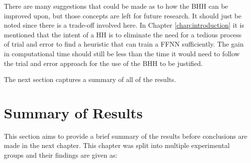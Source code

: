 There are many suggestions that could be made as to how the \ac{BHH} can be improved upon, but those concepts are left for future research. It should just be noted since there is a trade-off involved here. In Chapter \ref{chap:introduction} it is mentioned that the intent of a \ac{HH} is to eliminate the need for a tedious process of trial and error to find a heuristic that can train a \ac{FFNN} sufficiently. The gain in computational time should still be less than the time it would need to follow the trial and error approach for the use of the \Ac{BHH} to be justified. 

The next section captures a summary of all of the results.

\section{Summary of Results}
\label{sec:results:summary}

This section aims to provide a brief summary of the results before conclusions are made in the next chapter. This chapter was split into multiple experimental groups and their findings are given as:

